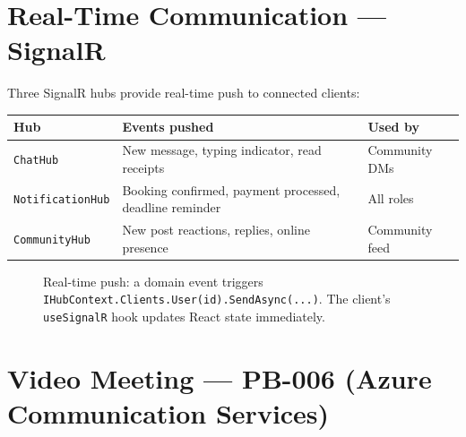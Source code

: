 \documentclass[11pt,a4paper]{article}
\begin{document}
\section{Real-Time Communication --- SignalR}

Three SignalR hubs provide real-time push to connected clients:

\begin{center}
\begin{tabular}{lll}
\toprule
\textbf{Hub} & \textbf{Events pushed} & \textbf{Used by}\\
\midrule
\texttt{ChatHub} & New message, typing indicator, read receipts & Community DMs\\
\texttt{NotificationHub} & Booking confirmed, payment processed, deadline reminder & All roles\\
\texttt{CommunityHub} & New post reactions, replies, online presence & Community feed\\
\bottomrule
\end{tabular}
\end{center}

\begin{figure}[H]
\centering
{}
\caption{Real-time push: a domain event triggers \texttt{IHubContext.Clients.User(id).SendAsync(...)}.
  The client's \texttt{useSignalR} hook updates React state immediately.}
\end{figure}

\section{Video Meeting --- PB-006 (Azure Communication Services)}
\end{document}

